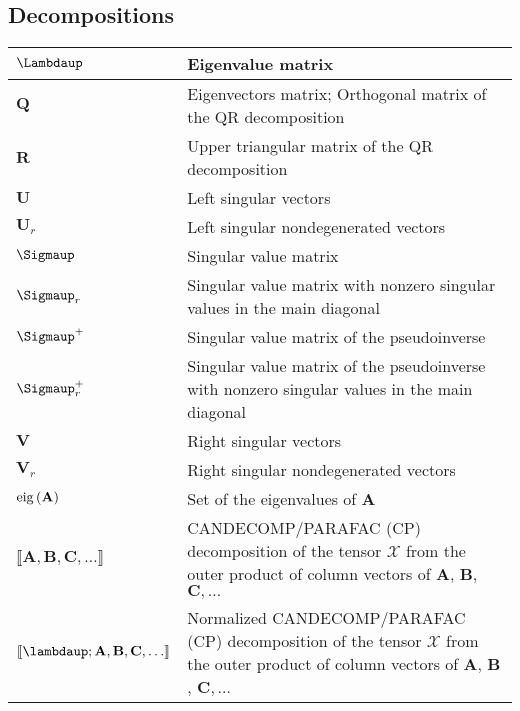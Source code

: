 \documentclass{article}
\begin{document}
\subsection{Decompositions}
\begin{xltabular}{\textwidth}{XX}
    \(\boldsymbol{\Lambdaup}\) & Eigenvalue matrix \cite{strangIntroductionLinearAlgebra1993}\\ \hline
    \(\mathbf{Q}\) & Eigenvectors matrix; Orthogonal matrix of the QR decomposition\cite{strangIntroductionLinearAlgebra1993}\\ \hline
    \(\mathbf{R}\) & Upper triangular matrix of the QR decomposition\cite{strangIntroductionLinearAlgebra1993}\\ \hline
    \(\mathbf{U}\) & Left singular vectors\cite{strangIntroductionLinearAlgebra1993}\\ \hline
    \(\mathbf{U}_r\) & Left singular nondegenerated vectors\\ \hline
    \(\boldsymbol{\Sigmaup}\) & Singular value matrix\\ \hline
    \(\boldsymbol{\Sigmaup}_r\) & Singular value matrix with nonzero singular values in the main diagonal\\ \hline
    \(\boldsymbol{\Sigmaup}^{+}\) & Singular value matrix of the pseudoinverse \cite{strangIntroductionLinearAlgebra1993}\\ \hline
    \(\boldsymbol{\Sigmaup}^{+}_r\) & Singular value matrix of the pseudoinverse with nonzero singular values in the main diagonal\\ \hline
    \(\mathbf{V}\) & Right singular vectors \cite{strangIntroductionLinearAlgebra1993}\\ \hline
    \(\mathbf{V}_r\) & Right singular nondegenerated vectors\\ \hline
    \(\operatorname{eig}\left(\mathbf{A}\right)\) & Set of the eigenvalues of \(\mathbf{A}\) \cite{chellappaSignalProcessingTheory2014,leon-garciaProbabilityStatisticsRandom2007,petersenMatrixCookbook2008}\\ \hline
    \(\llbracket \mathbf{A}, \mathbf{B}, \mathbf{C}, \dots \rrbracket\) & CANDECOMP/PARAFAC (CP) decomposition of the tensor \(\bm{\mathcal{X}}\) from the outer product of column vectors of \(\mathbf{A}\), \(\mathbf{B}\), \(\mathbf{C}, \dots\)\\ \hline
    \(\llbracket \boldsymbol{\lambdaup}; \mathbf{A}, \mathbf{B}, \mathbf{C}, \dots \rrbracket\) & Normalized CANDECOMP/PARAFAC (CP) decomposition of the tensor \(\bm{\mathcal{X}}\) from the outer product of column vectors of \(\mathbf{A}\), \(\mathbf{B}\), \(\mathbf{C}, \dots\)\\
\end{xltabular}
\end{document}
